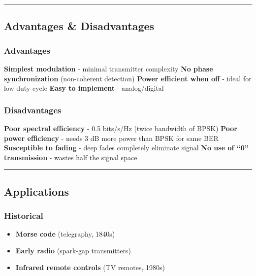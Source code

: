 \begin{center}\rule{0.5\linewidth}{0.5pt}\end{center}

\subsection{\texorpdfstring{ Advantages \&
Disadvantages}{ Advantages \& Disadvantages}}\label{advantages-disadvantages}

\subsubsection{Advantages}\label{advantages}

\textbf{Simplest modulation} - minimal transmitter complexity \textbf{No
phase synchronization} (non-coherent detection) \textbf{Power efficient
when off} - ideal for low duty cycle \textbf{Easy to implement} -
analog/digital

\subsubsection{Disadvantages}\label{disadvantages}

\textbf{Poor spectral efficiency} - 0.5 bits/s/Hz (twice bandwidth of
BPSK) \textbf{Poor power efficiency} - needs 3 dB more power than BPSK
for same BER \textbf{Susceptible to fading} - deep fades completely
eliminate signal \textbf{No use of ``0'' transmission} - wastes half the
signal space

\begin{center}\rule{0.5\linewidth}{0.5pt}\end{center}

\subsection{\texorpdfstring{
Applications}{ Applications}}\label{applications}

\subsubsection{Historical}\label{historical}

\begin{itemize}
\tightlist
\item
  \textbf{Morse code} (telegraphy, 1840s)
\item
  \textbf{Early radio} (spark-gap transmitters)
\item
  \textbf{Infrared remote controls} (TV remotes, 1980s)
\end{itemize}

